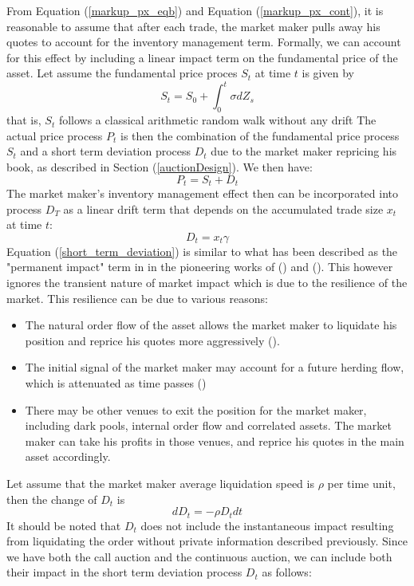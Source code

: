 \documentclass{article}
\begin{document}
From Equation (\ref{markup_px_eqb}) and Equation (\ref{markup_px_cont}), it is reasonable to assume that after each trade, the market maker pulls away his quotes to account for the inventory management term. Formally, we can account for this effect by including a linear impact term on the fundamental price of the asset. Let assume the fundamental price proces $S_t$ at time $t$ is given by
\[
S_t = S_0 + \int_0^t \sigma dZ_s
\]
that is, $S_t$ follows a classical arithmetic random walk without any drift The actual price process $P_t$ is then the combination of the fundamental price process $S_t$ and a short term deviation process $D_t$ due to the market maker repricing his book, as described in Section (\ref{auctionDesign}). We then have:
\[
P_t = S_t + D_t
\]
The market maker's inventory management effect then can be incorporated into process $D_T$ as a linear drift term that depends on the accumulated trade size $x_t$ at time $t$:
\begin{equation}\label{short_term_deviation}
D_t = x_t \gamma
\end{equation}
Equation (\ref{short_term_deviation}) is similar to what has been described as the "permanent impact" term in in the pioneering works of (\cite{BertimasLo1999}) and (\cite{AlmgrenChriss2000}). This however ignores the transient nature of market impact which is due to the resilience of the market. This resilience can be due to various reasons:
\begin{itemize}
\item The natural order flow of the asset allows the market maker to liquidate his position and reprice his quotes more aggressively (\cite{Avellaneda2008}).
\item The initial signal of the market maker may account for a future herding flow, which is attenuated as time passes (\cite{Thibault2015})
\item There may be other venues to exit the position for the market maker, including dark pools, internal order flow and correlated assets. The market maker can take his profits in those venues, and reprice his quotes in the main asset accordingly.
\end{itemize}
Let assume that the market maker average liquidation speed is $\rho$ per time unit, then the change of $D_t$ is 
\[
dD_t = -\rho D_t dt
\]
It should be noted that $D_t$ does not include the instantaneous impact resulting from liquidating the order without private information described previously. Since we have both the call auction and the continuous auction, we can include both their impact in the short term deviation process $D_t$ as follows:
\end{document}
